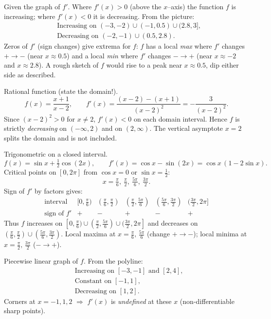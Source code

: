 \documentclass[11pt]{article}
\def\textbf#1{#1}%
\begin{document}
\begin{solution}
\textbf{Given the graph of $f'$.}
Where $f'(x)>0$ (above the $x$–axis) the function $f$ is increasing; where $f'(x)<0$ it is decreasing.  
From the picture:
\[
\begin{aligned}
&\text{Increasing on } (-3,-2)\cup(-1,0.5)\cup(2.8,3],\\
&\text{Decreasing on } (-2,-1)\cup(0.5,2.8).
\end{aligned}
\]
Zeros of $f'$ (sign changes) give extrema for $f$:  
$f$ has a local \emph{max} where $f'$ changes $+\to-$ (near $x\approx 0.5$) and a local \emph{min} where $f'$ changes $-\to+$ (near $x\approx -2$ and $x\approx 2.8$).  
A rough sketch of $f$ would rise to a peak near $x\approx0.5$, dip either side as described.
\end{solution}

\begin{solution}
\textbf{Rational function (state the domain!).}
\[
f(x)=\frac{x+1}{x-2},\qquad f'(x)=\frac{(x-2)-(x+1)}{(x-2)^{2}}=\boxed{-\frac{3}{(x-2)^{2}}}.
\]
Since $(x-2)^2>0$ for $x\ne2$, $f'(x)<0$ on each domain interval.  
Hence $f$ is strictly \emph{decreasing} on $(-\infty,2)$ and on $(2,\infty)$.  
The vertical asymptote $x=2$ splits the domain and is not included.
\end{solution}

\begin{solution}
\textbf{Trigonometric on a closed interval.}
\[
f(x)=\sin x+\tfrac12\cos(2x),\qquad f'(x)=\cos x-\sin(2x)=\cos x\,(1-2\sin x).
\]
Critical points on $[0,2\pi]$ from $\cos x=0$ or $\sin x=\tfrac12$:
\[
x=\boxed{\tfrac{\pi}{6},\ \tfrac{\pi}{2},\ \tfrac{5\pi}{6},\ \tfrac{3\pi}{2}}.
\]
Sign of $f'$ by factors gives:
\[
\begin{array}{c|ccccc}
\text{interval} & [0,\tfrac{\pi}{6}) & (\tfrac{\pi}{6},\tfrac{\pi}{2}) & (\tfrac{\pi}{2},\tfrac{5\pi}{6}) &
(\tfrac{5\pi}{6},\tfrac{3\pi}{2}) & (\tfrac{3\pi}{2},2\pi] \\ \hline
\text{sign of } f' & + & - & + & - & +
\end{array}
\]
Thus $f$ increases on $[0,\tfrac{\pi}{6})\cup(\tfrac{\pi}{2},\tfrac{5\pi}{6})\cup(\tfrac{3\pi}{2},2\pi]$ and decreases on $(\tfrac{\pi}{6},\tfrac{\pi}{2})\cup(\tfrac{5\pi}{6},\tfrac{3\pi}{2})$.  
Local maxima at $x=\tfrac{\pi}{6},\,\tfrac{5\pi}{6}$ (change $+\to-$); local minima at $x=\tfrac{\pi}{2},\,\tfrac{3\pi}{2}$ ($-\to+$).
\end{solution}

\begin{solution}
\textbf{Piecewise linear graph of $f$.}
From the polyline:
\[
\begin{aligned}
&\text{Increasing on }[-3,-1]\text{ and }[2,4],\\
&\text{Constant on }[-1,1],\\
&\text{Decreasing on }[1,2].
\end{aligned}
\]
Corners at $x=-1,1,2$ $\Rightarrow$ $f'(x)$ is \emph{undefined} at these $x$ (non-differentiable sharp points).
\end{solution}
\end{document}
